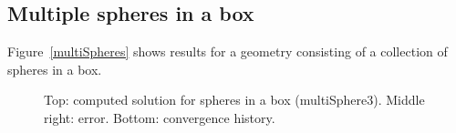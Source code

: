 \documentclass{article}
\begin{document}


\subsection{Multiple spheres in a box}

Figure~\ref{multiSpheres} shows results for a geometry consisting of a collection of spheres in a box.

{
\newcommand{\figWidth}{8.cm}
\newcommand{\trimfig}[2]{\trimPlotb{#1}{#2}{.0}{.0}{.0}{.0}}
\newcommand{\figWidtha}{7.cm}
\newcommand{\trimfiga}[2]{\trimPlotb{#1}{#2}{.0}{.0}{. }{.0}}
\begin{figure}[hbt]
\begin{center}
\end{center}
\caption{Top: computed solution for spheres in a box (multiSphere3). Middle right: error. Bottom: convergence history.}
\label{fig:multiSpheres}
\end{figure}
}
\end{document}
